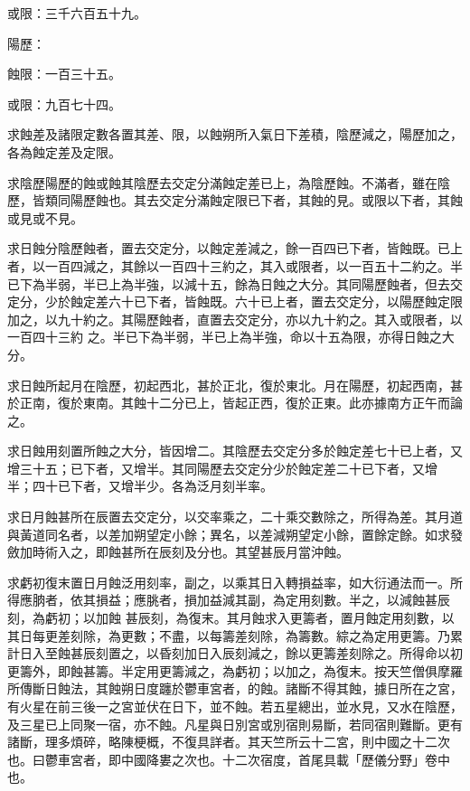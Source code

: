 \begin{pinyinscope}
 或限：三千六百五十九。



 陽歷：



 蝕限：一百三十五。



 或限：九百七十四。



 求蝕差及諸限定數各置其差、限，以蝕朔所入氣日下差積，陰歷減之，陽歷加之，各為蝕定差及定限。



 求陰歷陽歷的蝕或蝕其陰歷去交定分滿蝕定差已上，為陰歷蝕。不滿者，雖在陰歷，皆類同陽歷蝕也。其去交定分滿蝕定限已下者，其蝕的見。或限以下者，其蝕
 或見或不見。



 求日蝕分陰歷蝕者，置去交定分，以蝕定差減之，餘一百四已下者，皆蝕既。已上者，以一百四減之，其餘以一百四十三約之，其入或限者，以一百五十二約之。半已下為半弱，半已上為半強，以減十五，餘為日蝕之大分。其同陽歷蝕者，但去交定分，少於蝕定差六十已下者，皆蝕既。六十已上者，置去交定分，以陽歷蝕定限加之，以九十約之。其陽歷蝕者，直置去交定分，亦以九十約之。其入或限者，以一百四十三約
 之。半已下為半弱，半已上為半強，命以十五為限，亦得日蝕之大分。



 求日蝕所起月在陰歷，初起西北，甚於正北，復於東北。月在陽歷，初起西南，甚於正南，復於東南。其蝕十二分已上，皆起正西，復於正東。此亦據南方正午而論之。



 求日蝕用刻置所蝕之大分，皆因增二。其陰歷去交定分多於蝕定差七十已上者，又增三十五；已下者，又增半。其同陽歷去交定分少於蝕定差二十已下者，又增
 半；四十已下者，又增半少。各為泛月刻半率。



 求日月蝕甚所在辰置去交定分，以交率乘之，二十乘交數除之，所得為差。其月道與黃道同名者，以差加朔望定小餘；異名，以差減朔望定小餘，置餘定餘。如求發斂加時術入之，即蝕甚所在辰刻及分也。其望甚辰月當沖蝕。



 求虧初復末置日月蝕泛用刻率，副之，以乘其日入轉損益率，如大衍通法而一。所得應朒者，依其損益；應朓者，損加益減其副，為定用刻數。半之，以減蝕甚辰刻，為虧初；以加蝕
 甚辰刻，為復末。其月蝕求入更籌者，置月蝕定用刻數，以其日每更差刻除，為更數；不盡，以每籌差刻除，為籌數。綜之為定用更籌。乃累計日入至蝕甚辰刻置之，以昏刻加日入辰刻減之，餘以更籌差刻除之。所得命以初更籌外，即蝕甚籌。半定用更籌減之，為虧初；以加之，為復末。按天竺僧俱摩羅所傳斷日蝕法，其蝕朔日度躔於鬱車宮者，的蝕。諸斷不得其蝕，據日所在之宮，有火星在前三後一之宮並伏在日下，並不蝕。若五星總出，並水見，又水在陰歷，及三星已上同聚一宿，亦不蝕。凡星與日別宮或別宿則易斷，若同宿則難斷。更有諸斷，理多煩碎，略陳梗概，不復具詳者。其天竺所云十二宮，則中國之十二次也。曰鬱車宮者，即中國降婁之次也。十二次宿度，首尾具載「歷儀分野」卷中也。




\end{pinyinscope}
